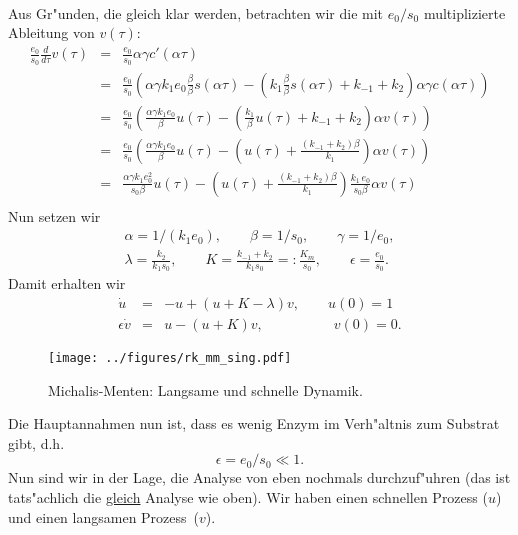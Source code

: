 {\begin{eqnarray*}
\end{eqnarray*}
Aus Gr"unden, die gleich klar werden, betrachten wir die mit $e_0/s_0$ multiplizierte Ableitung von $v(\tau)$:
\begin{eqnarray*}
\frac{e_0}{s_0}\frac d {d\tau}v(\tau) & = & \frac{e_0}{s_0}\alpha \gamma c'(\alpha\tau)\\
& = &\frac{e_0}{s_0} (\alpha \gamma k_1  e_0  \frac {\beta}{\beta}s(\alpha\tau) - (k_1 \frac {\beta}{\beta}s(\alpha\tau) + k_{-1} + k_2) \alpha \gamma c(\alpha\tau) )\\
& = &\frac{e_0}{s_0} ( \frac {\alpha \gamma k_1  e_0 }{\beta}u(\tau) - (\frac {k_1}{\beta}u(\tau) + k_{-1} + k_2) \alpha v(\tau) )\\
& = & \frac{e_0}{s_0}( \frac {\alpha \gamma k_1  e_0 }{\beta}u(\tau) - (u(\tau) + \frac{(k_{-1} + k_2)\beta}{k_1}) \alpha v(\tau) )\\
& = & \frac {\alpha \gamma k_1  e_0^2 }{s_0\beta}u(\tau) - \left(u(\tau) + \frac{(k_{-1} + k_2)\beta}{k_1}\right) \frac{k_1\, e_0}{s_0\beta}\alpha v(\tau) \\
\end{eqnarray*}
Nun setzen wir
\begin{eqnarray*}
\alpha = 1/(k_1 e_0),\qquad \beta = 1/s_0,\qquad \gamma = 1/e_0,\\
\lambda = \frac{k_2}{k_1 s_0},\qquad
K = \frac{k_{-1}+k_2}{k_1 s_0} =: \frac{K_m}{s_0},\qquad
\epsilon = \frac{e_0}{s_0}.
\end{eqnarray*}
Damit erhalten wir
\begin{eqnarray*}
         \dot u & = & -u + (u+K-\lambda) v,\qquad u(0) = 1\\
\epsilon \dot v & = & u - (u+K) v,\qquad\qquad\quad v(0) = 0.
\end{eqnarray*}
\begin{figure}[htbp] %
   \centering
   \texttt{[image: ../figures/rk\_mm\_sing.pdf]}
   \caption{Michalis-Menten: Langsame und schnelle Dynamik.}
   \label{rk:mm:sing}
\end{figure}
Die Hauptannahmen nun ist, dass es wenig Enzym im Verh"altnis zum Substrat
gibt, d.h.
$$ \epsilon = e_0/s_0\ll 1.$$
Nun sind wir in der Lage, die Analyse von eben nochmals durchzuf"uhren (das ist tats"achlich die \underline{gleich} Analyse wie oben). Wir haben  einen schnellen Prozess ($u$) und einen langsamen Prozess~($v$).\par\medskip
}

